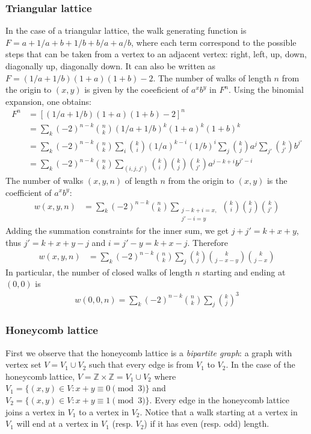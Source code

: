 \documentclass[12pt]{article}
\begin{document}
\subsubsection*{Triangular lattice}
In the case of a triangular lattice, the walk generating function is $F = a + 1/a + b + 1/b + b/a + a/b$, where each term correspond to the possible steps that can be taken from a vertex to an adjacent vertex: right, left, up, down, diagonally up, diagonally down. It can also be written as $F = (1/a+1/b)(1+a)(1+b) - 2$. The number of walks of length $n$ from the origin to $(x,y)$ is given by the coeeficient of $a^xb^y$ in $F^n$. Using the binomial expansion, one obtains:
\begin{align*}
 F^n &= [(1/a+1/b)(1+a)(1+b) - 2]^n \\
     &= \sum_k (-2)^{n-k} \binom{n}{k} (1/a + 1/b)^k(1+a)^k(1+b)^k\\
     &= \sum_k (-2)^{n-k} \binom{n}{k} \sum_i\binom{k}{i} (1/a)^{k-i}(1/b)^{i} \sum_j\binom{k}{j}a^j \sum_{j'}\binom{k}{j'}b^{j'} \\
     &= \sum_k (-2)^{n-k} \binom{n}{k} \sum_{(i,j,j')} \binom{k}{i}\binom{k}{j}\binom{k}{j'} a^{j-k+i} b^{j'-i}
\end{align*}
The number of walks $(x,y,n)$ of length $n$ from the origin to $(x,y)$ is the coefficient of $a^xb^y$:
\begin{align*}
  w(x,y,n) &= \sum_k(-2)^{n-k}\binom{n}{k} \sum_{\substack{j-k+i = x,\\ j'-i = y}} \binom{k}{i}\binom{k}{j}\binom{k}{j'}
\end{align*}
Adding the summation constraints for the inner sum, we get $j + j' = k + x + y$, thus $j'= k + x + y -j$ and $i = j' - y = k + x - j$. Therefore
\begin{align*}
 w(x,y,n) &= \sum_k(-2)^{n-k}\binom{n}{k} \sum_j \binom{k}{j} \binom{k}{j-x-y}\binom{k}{j-x}
\end{align*}
In particular, the number of closed walks of length $n$ starting and ending at $(0,0)$ is
\begin{align*}
   w(0,0,n) = \sum_k(-2)^{n-k}\binom{n}{k} \sum_j \binom{k}{j}^3
\end{align*}

\subsubsection*{Honeycomb lattice}
First we observe that the honeycomb lattice is a {\em bipartite graph}: a graph with vertex set $V = V_1 \cup V_2$ such that every edge is from $V_1$ to $V_2$.  In the case of the honeycomb lattice, $V = \mathbb{Z} \times \mathbb{Z} = V_1 \cup V_2$ where $V_1 = \{(x,y) \in V: x + y \equiv 0 \pmod{3} \}$ and $V_2 = \{(x,y) \in V: x + y \equiv 1 \pmod{3} \}$. Every edge in the honeycomb lattice joins a vertex in $V_1$ to a vertex in $V_2$. Notice that a walk starting at a vertex in $V_1$ will end at a vertex in $V_1$ (resp. $V_2$) if it has even (resp. odd) length.
\end{document}

